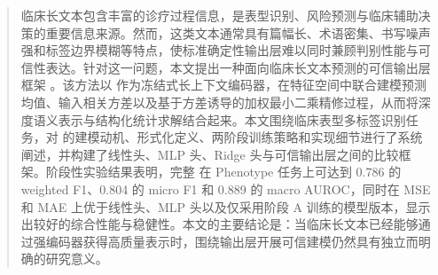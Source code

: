 \begin{abstract}
临床长文本包含丰富的诊疗过程信息，是表型识别、风险预测与临床辅助决策的重要信息来源。然而，这类文本通常具有篇幅长、术语密集、书写噪声强和标签边界模糊等特点，使标准确定性输出层难以同时兼顾判别性能与可信性表达。针对这一问题，本文提出一种面向临床长文本预测的可信输出层框架 \method{}。该方法以 \encoder{} 作为冻结式长上下文编码器，在特征空间中联合建模预测均值、输入相关方差以及基于方差诱导的加权最小二乘精修过程，从而将深度语义表示与结构化统计求解结合起来。本文围绕临床表型多标签识别任务，对 \method{} 的建模动机、形式化定义、两阶段训练策略和实现细节进行了系统阐述，并构建了线性头、MLP 头、Ridge 头与可信输出层之间的比较框架。阶段性实验结果表明，完整 \method{} 在 Phenotype 任务上可达到 0.786 的 weighted F1、0.804 的 micro F1 和 0.889 的 macro AUROC，同时在 MSE 和 MAE 上优于线性头、MLP 头以及仅采用阶段 A 训练的模型版本，显示出较好的综合性能与稳健性。本文的主要结论是：当临床长文本已经能够通过强编码器获得高质量表示时，围绕输出层开展可信建模仍然具有独立而明确的研究意义。
\end{abstract}
